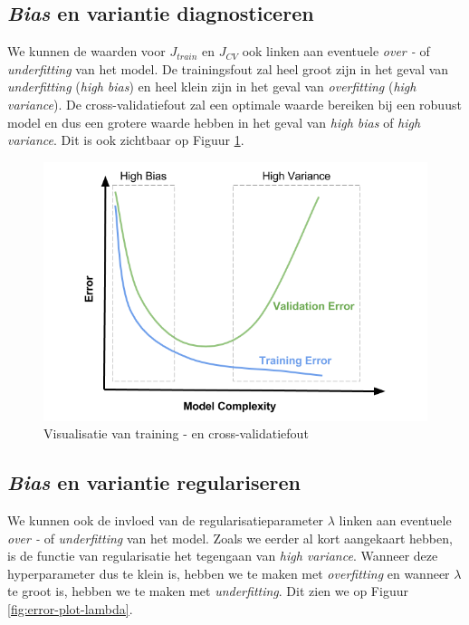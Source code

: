 \subsection{\textit{Bias} en variantie diagnosticeren}

We kunnen de waarden voor $J_{train}$ en $J_{CV}$ ook linken aan eventuele \textit{over -} of \textit{underfitting} van het model. De trainingsfout zal heel groot zijn in het geval van \textit{underfitting} (\textit{high bias}) en heel klein zijn in het geval van \textit{overfitting} (\textit{high variance}). De cross-validatiefout zal een optimale waarde bereiken bij een robuust model en dus een grotere waarde hebben in het geval van \textit{high bias} of \textit{high variance}. Dit is ook zichtbaar op Figuur \ref{fig:error-plot}.

\begin{figure}[h]
	\centering
	\includegraphics[width=0.65\linewidth]{images/18-error-plot.png}
	\caption{Visualisatie van training - en cross-validatiefout}
	\label{fig:error-plot}
\end{figure}

\subsection{\textit{Bias} en variantie regulariseren}

We kunnen ook de invloed van de regularisatieparameter $\lambda$ linken aan eventuele \textit{over -} of \textit{underfitting} van het model. Zoals we eerder al kort aangekaart hebben, is de functie van regularisatie het tegengaan van \textit{high variance}. Wanneer deze hyperparameter dus te klein is, hebben we te maken met \textit{overfitting} en wanneer $\lambda$ te groot is, hebben we te maken met \textit{underfitting}. Dit zien we op Figuur \ref{fig:error-plot-lambda}. 

